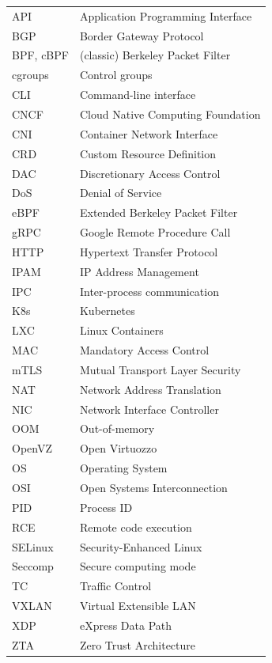 \documentclass[english, 12pt, a4paper, sci, utf8, a-2b, online]{aaltothesis}
\begin{document}
\begin{tabular}{ll}
  API         & Application Programming Interface   \\
  BGP         & Border Gateway Protocol             \\
  BPF, cBPF   & (classic) Berkeley Packet Filter    \\
  cgroups     & Control groups                      \\
  CLI         & Command-line interface              \\
  CNCF        & Cloud Native Computing Foundation   \\
  CNI         & Container Network Interface         \\
  CRD         & Custom Resource Definition          \\
  DAC         & Discretionary Access Control        \\
  DoS         & Denial of Service                   \\
  eBPF        & Extended Berkeley Packet Filter     \\
  gRPC        & Google Remote Procedure Call        \\
  HTTP        & Hypertext Transfer Protocol         \\
  IPAM        & IP Address Management               \\
  IPC         & Inter-process communication         \\
  K8s         & Kubernetes                          \\
  LXC         & Linux Containers                    \\
  MAC         & Mandatory Access Control            \\
  mTLS        & Mutual Transport Layer Security     \\
  NAT         & Network Address Translation         \\
  NIC         & Network Interface Controller        \\
  OOM         & Out-of-memory                       \\
  OpenVZ      & Open Virtuozzo                      \\
  OS          & Operating System                    \\
  OSI         & Open Systems Interconnection        \\
  PID         & Process ID                          \\
  RCE         & Remote code execution               \\
  SELinux     & Security-Enhanced Linux             \\
  Seccomp     & Secure computing mode               \\
  TC          & Traffic Control                     \\
  VXLAN       & Virtual Extensible LAN              \\
  XDP         & eXpress Data Path                   \\
  ZTA         & Zero Trust Architecture             \\
\end{tabular}
\end{document}
